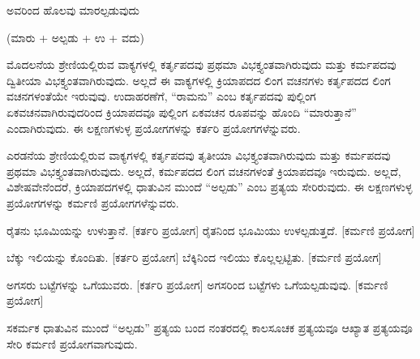 \indent ಅವರಿಂದ ಹೊಲವು ಮಾರಲ್ಪಡುವುದು\par

\indent (ಮಾರು + ಅಲ್ಪಡು + ಉ + ವದು)\par

\indent ಮೊದಲನೆಯ ಶ್ರೇಣಿಯಲ್ಲಿರುವ ವಾಕ್ಯಗಳಲ್ಲಿ ಕರ್ತೃಪದವು ಪ್ರಥಮಾ ವಿಭಕ್ತ್ಯಂತವಾಗಿರುವುದು ಮತ್ತು ಕರ್ಮಪದವು ದ್ವಿತೀಯಾ ವಿಭಕ್ತ್ಯಂತವಾಗಿರುವುದು. ಅಲ್ಲದೆ ಈ ವಾಕ್ಯಗಳಲ್ಲಿ ಕ್ರಿಯಾಪದದ ಲಿಂಗ ವಚನಗಳು ಕರ್ತೃಪದದ ಲಿಂಗ ವಚನಗಳಂತೆಯೇ ಇರುವುವು. ಉದಾಹರಣೆಗೆ, “ರಾಮನು” ಎಂಬ ಕರ್ತೃಪದವು ಪುಲ್ಲಿಂಗ ಏಕವಚನವಾಗಿರುವುದರಿಂದ ಕ್ರಿಯಾಪದವೂ ಪುಲ್ಲಿಂಗ ಏಕವಚನ ರೂಪವನ್ನು ಹೊಂದಿ “ಮಾರುತ್ತಾನೆ” ಎಂದಾಗಿರುವುದು. ಈ ಲಕ್ಷಣಗಳುಳ್ಳ ಪ್ರಯೋಗಗಳನ್ನು ಕರ್ತರಿ ಪ್ರಯೋಗಗಳೆನ್ನುವರು.\par

\indent ಎರಡನೆಯ ಶ್ರೇಣಿಯಲ್ಲಿರುವ ವಾಕ್ಯಗಳಲ್ಲಿ ಕರ್ತೃಪದವು ತೃತೀಯಾ ವಿಭಕ್ತ್ಯಂತವಾಗಿರುವುದು ಮತ್ತು ಕರ್ಮಪದವು ಪ್ರಥಮಾ ವಿಭಕ್ತ್ಯಂತವಾಗಿರುವುದು. ಅಲ್ಲದೆ, ಕರ್ಮಪದದ ಲಿಂಗ ವಚನಗಳಂತೆ ಕ್ರಿಯಾಪದವೂ ಇರುವುದು. ಅಲ್ಲದೆ, ವಿಶೇಷವೇನೆಂದರೆ, ಕ್ರಿಯಾಪದಗಳಲ್ಲಿ ಧಾತುವಿನ ಮುಂದೆ “ಅಲ್ಪಡು” ಎಂಬ ಪ್ರತ್ಯಯ ಸೇರಿರುವುದು. ಈ ಲಕ್ಷಣಗಳುಳ್ಳ ಪ್ರಯೋಗಗಳನ್ನು ಕರ್ಮಣಿ ಪ್ರಯೋಗಗಳೆನ್ನುವರು.\par

\vspace{3pt plus 2pt}\noindent\hspace*{1.2em}\par\vspace{1pt}

\vspace{2.5pt plus 3pt minus 0.5pt}\noindent\hspace*{1.2em}\hspace{0.55em}ರೈತನು ಭೂಮಿಯನ್ನು ಉಳುತ್ತಾನೆ. {[}ಕರ್ತರಿ ಪ್ರಯೋಗ{]} ರೈತನಿಂದ ಭೂಮಿಯು ಉಳಲ್ಪಡುತ್ತದೆ. {[}ಕರ್ಮಣಿ ಪ್ರಯೋಗ{]}\par

\vspace{2.5pt plus 3pt minus 0.5pt}\noindent\hspace*{1.2em}\hspace{0.55em}ಬೆಕ್ಕು ಇಲಿಯನ್ನು ಕೊಂದಿತು. {[}ಕರ್ತರಿ ಪ್ರಯೋಗ{]} ಬೆಕ್ಕಿನಿಂದ ಇಲಿಯು ಕೊಲ್ಲಲ್ಪಟ್ಟಿತು. {[}ಕರ್ಮಣಿ ಪ್ರಯೋಗ{]}\par

\vspace{2.5pt plus 3pt minus 0.5pt}\noindent\hspace*{1.2em}\hspace{0.55em}ಅಗಸರು ಬಟ್ಟೆಗಳನ್ನು ಒಗೆಯುವರು. {[}ಕರ್ತರಿ ಪ್ರಯೋಗ{]} ಅಗಸರಿಂದ ಬಟ್ಟೆಗಳು ಒಗೆಯಲ್ಪಡುವುವು. {[}ಕರ್ಮಣಿ ಪ್ರಯೋಗ{]}\par


\vspace{2.5pt plus 3pt minus 0.5pt}\noindent\hspace*{1.2em}\hspace{0.55em}ಸಕರ್ಮಕ ಧಾತುವಿನ ಮುಂದೆ “ಅಲ್ಪಡು” ಪ್ರತ್ಯಯ ಬಂದ ನಂತರದಲ್ಲಿ ಕಾಲಸೂಚಕ ಪ್ರತ್ಯಯವೂ ಆಖ್ಯಾತ ಪ್ರತ್ಯಯವೂ ಸೇರಿ ಕರ್ಮಣಿ ಪ್ರಯೋಗವಾಗುವುದು.\par

